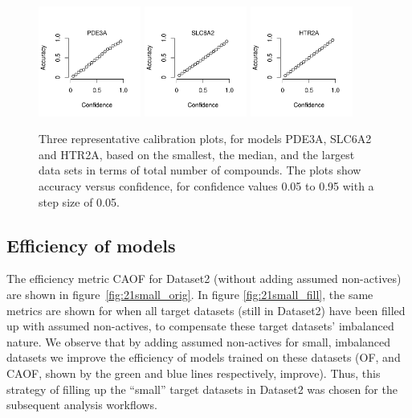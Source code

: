 \documentclass[utf8]{frontiersSCNS} %
\begin{document}
\begin{figure}[h!]
\includegraphics[width=0.3\textwidth]{figures/calibration_plots/pde3a_calib.pdf}
\includegraphics[width=0.3\textwidth]{figures/calibration_plots/slc6a2_calib.pdf}
\includegraphics[width=0.3\textwidth]{figures/calibration_plots/htr2a_calib.pdf}
    \caption{Three representative calibration plots, for models PDE3A, SLC6A2
    and HTR2A, based on the smallest, the median, and the largest data sets in
    terms of total number of compounds. The plots show accuracy versus
    confidence, for confidence values 0.05 to 0.95 with a step size of 0.05.}
    \label{fig:calibration_plots}
\end{figure}


\subsection*{Efficiency of models}
The efficiency metric CAOF for Dataset2 (without adding assumed non-actives)
are shown in figure~\ref{fig:21small_orig}. In figure \ref{fig:21small_fill},
the same metrics are shown for when all target datasets (still in Dataset2)
have been filled up with assumed non-actives, to compensate these target
datasets' imbalanced nature.
We observe that by adding assumed non-actives for small, imbalanced datasets we
improve the efficiency of models trained on these datasets (OF, and CAOF, shown
by the green and blue lines respectively, improve). Thus, this strategy of
filling up the ``small'' target datasets in Dataset2 was chosen for the
subsequent analysis workflows.
\end{document}
